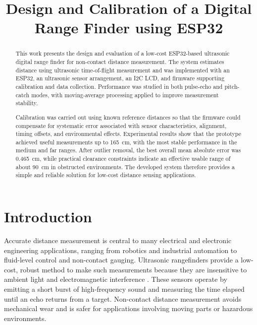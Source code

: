 \documentclass[10pt, conference, compsocconf]{IEEEtran}
\begin{document}
\title{Design and Calibration of a Digital Range Finder using ESP32}

\author{
}

\maketitle

\begin{abstract}
This work presents the design and evaluation of a low-cost ESP32-based
ultrasonic digital range finder for non-contact distance measurement.
The system estimates distance using ultrasonic time-of-flight
measurement and was implemented with an ESP32, an ultrasonic sensor
arrangement, an I2C LCD, and firmware supporting calibration and data
collection. Performance was studied in both pulse-echo and pitch-catch
modes, with moving-average processing applied to improve measurement
stability.

Calibration was carried out using known reference distances so that the
firmware could compensate for systematic error associated with sensor
characteristics, alignment, timing offsets, and environmental effects.
Experimental results show that the prototype achieved useful
measurements up to 165~cm, with the most stable performance in the
medium and far ranges. After outlier removal, the best overall mean
absolute error was 0.465~cm, while practical clearance constraints
indicate an effective usable range of about 90~cm in obstructed
environments. The developed system therefore provides a simple and
reliable solution for low-cost distance sensing applications.
\end{abstract}

\section{Introduction}
Accurate distance measurement is central to many electrical and electronic engineering applications, ranging from robotics and industrial automation to fluid-level control and non-contact gauging. Ultrasonic rangefinders provide a low-cost, robust method to make such measurements because they are insensitive to ambient light and electromagnetic interference \cite{mi13040520}. These sensors operate by emitting a short burst of high-frequency sound and measuring the time elapsed until an echo returns from a target. Non-contact distance measurement avoids mechanical wear and is safer for applications involving moving parts or hazardous environments.
\end{document}
